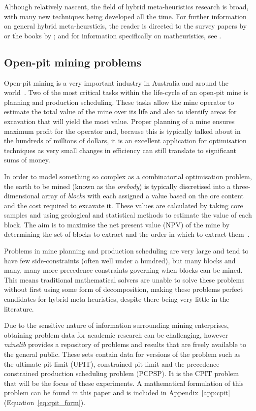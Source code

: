 \documentclass[preprint]{elsarticle}
\begin{document}
Although relatively nascent, the field of hybrid meta-heuristics research is broad, with many new techniques being developed all the time. For further information on general hybrid meta-heursticis, the reader is directed to the survey papers by \citet{talbi,hybridmeta,hybrid-decomp} or the books by \citet{hybrid-book1,hybrid-book2}; and for information specifically on matheuristics, see \citet{matheuristics,matheuristics-new1,matheuristics-new2}.

\subsection{Open-pit mining problems}
Open-pit mining is a very important industry in Australia and around the world~\citet{singh}. Two of the most critical tasks within the life-cycle of an open-pit mine is planning and production scheduling. These tasks allow the mine operator to estimate the total value of the mine over its life and also to identify areas for excavation that will yield the most value. Proper planning of a mine ensures maximum profit for the operator and, because this is typically talked about in the hundreds of millions of dollars, it is an excellent application for optimisation techniques as very small changes in efficiency can still translate to significant sums of money.

In order to model something so complex as a combinatorial optimisation problem, the earth to be mined (known as the \emph{orebody}) is typically discretised into a three-dimensional array of \emph{blocks} with each assigned a value based on the ore content and the cost required to excavate it. These values are calculated by taking core samples and using geological and statistical methods to estimate the value of each block. The aim is to maximise the net present value (NPV) of the mine by determining the set of blocks to extract and the order in which to extract them~\citep{meagher}.

Problems in mine planning and production scheduling are very large and tend to have few side-constraints (often well under a hundred), but many blocks and many, many more precedence constraints governing when blocks can be mined. This means traditional mathematical solvers are unable to solve these problems without first using some form of decomposition, making these problems perfect candidates for hybrid meta-heuristics, despite there being very little in the literature.

Due to the sensitive nature of information surrounding mining enterprises, obtaining problem data for academic research can be challenging, however \emph{minelib} \citep{minelib} provides a repository of problems and results that are freely available to the general public. These sets contain data for versions of the problem such as the ultimate pit limit (UPIT), constrained pit-limit and the precedence constrained production scheduling problem (PCPSP). It is the CPIT problem that will be the focus of these experiments. A mathematical formulation of this problem can be found in this paper and is included in Appendix~\ref{app:cpit} (Equation~\ref{eq:cpit_form}).
\end{document}
